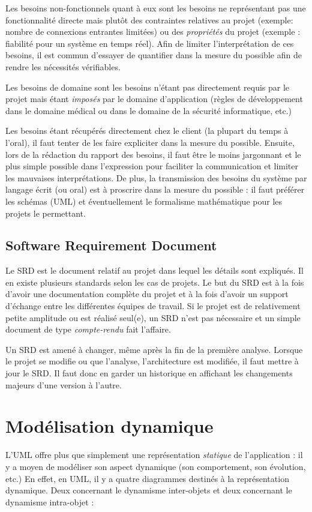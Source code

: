 \documentclass{article}
\begin{document}
	Les besoins non-fonctionnels quant à eux sont les besoins ne représentant pas une fonctionnalité directe mais plutôt des contraintes relatives au projet (exemple: nombre de connexions
	entrantes limitées) ou des \textit{propriétés} du projet (exemple : fiabilité pour un système en temps réel). Afin de limiter l'interprétation de ces besoins, il est commun d'essayer de
	quantifier dans la mesure du possible afin de rendre les nécessités vérifiables.

	Les besoins de domaine sont les besoins n'étant pas directement requis par le projet mais étant \textit{imposés} par le domaine d'application (règles de développement dans le domaine médical
	ou dans le domaine de la sécurité informatique, etc.)

	Les besoins étant récupérés directement chez le client (la plupart du temps à l'oral), il faut tenter de les faire expliciter dans la mesure du possible. Ensuite, lors de la rédaction
	du rapport des besoins, il faut être le moins jargonnant et le plus simple possible dans l'expression pour faciliter la communication et limiter les mauvaises interprétations.
	De plus, la transmission des besoins du système par langage écrit (ou oral) est à proscrire dans la mesure du possible : il faut préférer les schémas (UML) et éventuellement le formalisme
	mathématique pour les projets le permettant.

	\subsection{Software Requirement Document}
		Le SRD est le document relatif au projet dans lequel les détails sont expliqués. Il en existe plusieurs standards selon les cas de projets. Le but du SRD est à la fois d'avoir une
		documentation complète du projet et à la fois d'avoir un support d'échange entre les différentes équipes de travail. Si le projet est de relativement petite amplitude ou est réalisé seul(e),
		un SRD n'est pas nécessaire et un simple document de type \textit{compte-rendu} fait l'affaire.
		
		Un SRD est amené à changer, même après la fin de la première analyse. Lorsque le projet se modifie ou que l'analyse, l'architecture est modifiée, il faut mettre à jour le SRD. Il faut
		donc en garder un historique en affichant les changements majeurs d'une version à l'autre.
	
\section{Modélisation dynamique}
	L'UML offre plus que simplement une représentation \textit{statique} de l'application : il y a moyen de modéliser son aspect dynamique (son comportement, son évolution, etc.)
	En effet, en UML, il y a quatre diagrammes destinés à la représentation dynamique. Deux concernant le dynamisme inter-objets et deux concernant le dynamisme intra-objet :
\end{document}
